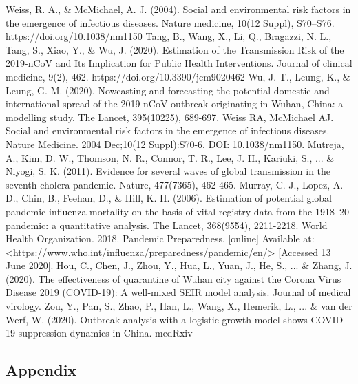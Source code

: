 \documentclass[a4paper, 11pt,twoside=true]{scrartcl}
\begin{document}
\newpage
\begin{thebibliography}{99}
	Weiss, R. A., \& McMichael, A. J. (2004). Social and environmental risk factors in the emergence of infectious diseases. Nature medicine, 10(12 Suppl), S70–S76. https://doi.org/10.1038/nm1150
	Tang, B., Wang, X., Li, Q., Bragazzi, N. L., Tang, S., Xiao, Y., \& Wu, J. (2020). Estimation of the Transmission Risk of the 2019-nCoV and Its Implication for Public Health Interventions. Journal of clinical medicine, 9(2), 462. https://doi.org/10.3390/jcm9020462
	Wu, J. T., Leung, K., \& Leung, G. M. (2020). Nowcasting and forecasting the potential domestic and international spread of the 2019-nCoV outbreak originating in Wuhan, China: a modelling study. The Lancet, 395(10225), 689-697.
	Weiss RA, McMichael AJ. Social and environmental risk factors in the emergence of infectious diseases. Nature Medicine. 2004 Dec;10(12 Suppl):S70-6. DOI: 10.1038/nm1150.
	Mutreja, A., Kim, D. W., Thomson, N. R., Connor, T. R., Lee, J. H., Kariuki, S., ... \& Niyogi, S. K. (2011). Evidence for several waves of global transmission in the seventh cholera pandemic. Nature, 477(7365), 462-465.
	Murray, C. J., Lopez, A. D., Chin, B., Feehan, D., \& Hill, K. H. (2006). Estimation of potential global pandemic influenza mortality on the basis of vital registry data from the 1918–20 pandemic: a quantitative analysis. The Lancet, 368(9554), 2211-2218.
	World Health Organization. 2018. Pandemic Preparedness. [online] Available at: <https://www.who.int/influenza/preparedness/pandemic/en/> [Accessed 13 June 2020].
	Hou, C., Chen, J., Zhou, Y., Hua, L., Yuan, J., He, S., ... \& Zhang, J. (2020). The effectiveness of quarantine of Wuhan city against the Corona Virus Disease 2019 (COVID‐19): A well‐mixed SEIR model analysis. Journal of medical virology.
	Zou, Y., Pan, S., Zhao, P., Han, L., Wang, X., Hemerik, L., ... \& van der Werf, W. (2020). Outbreak analysis with a logistic growth model shows COVID-19 suppression dynamics in China. medRxiv
\end{thebibliography}

\newpage
\subsection*{Appendix}
\end{document}
